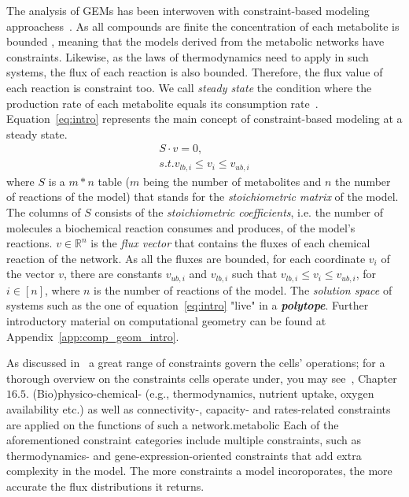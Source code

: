       
      The analysis of GEMs has been interwoven with constraint-based modeling approachess~\cite{lewis2012constraining}.
      As all compounds are finite the concentration of each metabolite is bounded \cite{palsson2015systems}, meaning that the models derived from the
      metabolic networks have constraints.
      Likewise, as the laws of thermodynamics need to apply in such systems, 
      the flux of each reaction is also bounded.
      Therefore, the flux value of each reaction is constraint too.
      We call 
      \textit{steady state} the condition where the production rate of each metabolite equals its consumption rate~\cite{cakmak2012new}. 
      Equation~\ref{eq:intro} represents the main concept of constraint-based modeling at a steady state.
      \begin{equation}
      \label{eq:intro}
         \begin{split}
               S \cdot v = 0 , \\
               s.t.  v_{lb,i} \le v_i \le v_{ub, i}
         \end{split}
       \end{equation}
      where
      $S$ is a $m*n$ table ($m$ being the number of metabolites and $n$ the number of reactions of the model) 
      that stands for the \textit{stoichiometric matrix} of the model.
      The columns of $S$ consists of the  
      \textit{stoichiometric coefficients}, 
      i.e. the number of molecules a biochemical reaction consumes and produces,
      of the model's reactions.          
      $v \in \mathbb{R}^n $ is the \textit{flux vector} that contains the fluxes
      of each chemical reaction of the network. 
      As all the fluxes are bounded, for each coordinate $v_i$ of the vector $v$,
      there are constants $v_{ub, i}$ and  $v_{lb, i}$
      such that $v_{lb,i} \le v_i \le v_{ub, i}$, for $i \in [n]$, 
      where $n$ is the number of reactions of the model.
      The \textit{solution space} of systems such as the one of equation~\ref{eq:intro} 
      "live" in a \textit{\textbf{polytope}}.
      Further introductory material on computational 
      geometry can be found at Appendix~\ref{app:comp_geom_intro}.

      As discussed in~\cite{reed2012shrinking} a great range of constraints 
      govern the cells' operations; for a thorough overview on the constraints cells operate under, you may see~\cite{palsson2015systems}, Chapter $16.5$. 
      (Bio)physico-chemical- (e.g., thermodynamics, nutrient uptake, oxygen availability etc.) as well as connectivity-, capacity- and rates-related constraints 
      are applied on the functions of such a network.metabolic 
      Each of the aforementioned constraint categories include multiple constraints, such as 
      thermodynamics- and gene-expression-oriented constraints that add extra complexity 
      in the model. 
      The more constraints a model incoroporates, the more accurate the flux distributions it returns.

